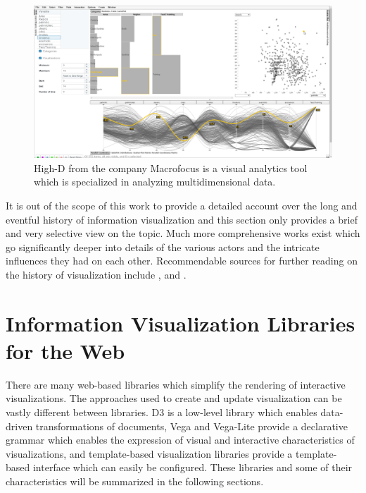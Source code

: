 \begin{figure}[tp]
\centering
\includegraphics[keepaspectratio,width=\linewidth,height=\fullh / 3]{images/high-d.png}
\caption[Screenshot of High-D]{
  High-D from the company Macrofocus is a visual analytics tool which is specialized in analyzing multidimensional data.
   
}
\label{fig:HighD}
\end{figure}

It is out of the scope of this work to provide a detailed account over the long and eventful history of information visualization and this section only provides a brief and very selective view on the topic.
Much more comprehensive works exist which go significantly deeper into details of the various actors and the intricate influences they had on each other.
Recommendable sources for further reading on the history of visualization include \cite{BriefHistoryOfDataVis}, \cite{HistoryOfDataVisAndGraphicCommunication} and \cite{HistoryOfInformationGraphics}.

\section{Information Visualization Libraries for the Web}

There are many web-based libraries which simplify the rendering of interactive visualizations.
The approaches used to create and update visualization can be vastly different between libraries.
D3 is a low-level library which enables data-driven transformations of documents, Vega and Vega-Lite provide a declarative grammar which enables the expression of visual and interactive characteristics of visualizations, and template-based visualization libraries provide a template-based interface which can easily be configured.
These libraries and some of their characteristics will be summarized in the following sections.

